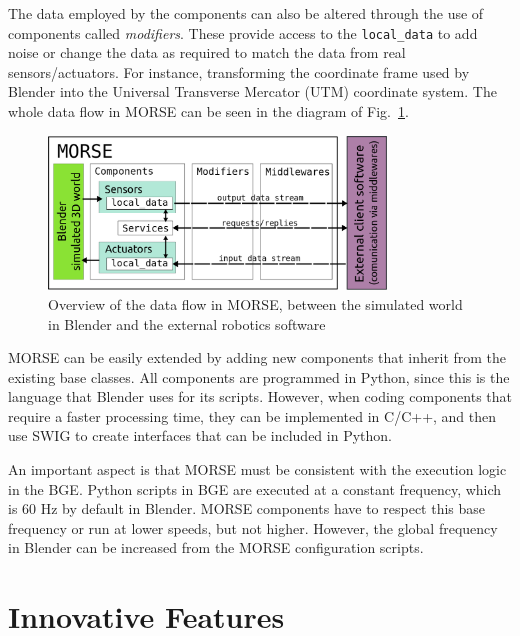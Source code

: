 \documentclass{llncs}
\begin{document}
The data employed by the components can also be altered through the use of
components called \emph{modifiers}. These provide access to the
\texttt{local\_data} to add noise or change the data as required to match the
data from real sensors/actuators. For instance, transforming the coordinate
frame used by Blender into the Universal Transverse Mercator (UTM) coordinate
system.
The whole data flow in MORSE can be seen in the diagram of
Fig.~\ref{fig:dataflow}.

\begin{figure}[ht!]
\centering
    \includegraphics[width=0.8\textwidth]{pics/simulation_main_loop-may2012.png}
\caption{Overview of the data flow in MORSE, between the simulated world
    in Blender and the external robotics software}
\label{fig:dataflow}
\end{figure}

MORSE can be easily extended by adding new components that inherit from the
existing base classes. All components are programmed in Python, since this is
the language that Blender uses for its scripts. However, when coding components
that require a faster processing time, they can be implemented in C/C++, and
then use SWIG to create interfaces that can be included in Python.

An important aspect is that MORSE must be consistent with the execution
logic in the BGE. Python scripts in BGE are executed at a constant
frequency, which is 60 Hz by default in Blender. MORSE components have to
respect this base frequency or run at lower speeds, but not higher. However,
the global frequency in Blender can be increased from the MORSE configuration
scripts.


\section{Innovative Features}
\label{section:features}


\end{document}
